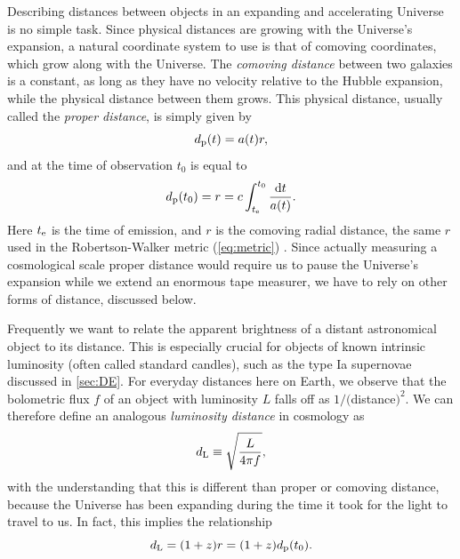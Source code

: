 Describing distances between objects in an expanding and accelerating Universe is no simple task. Since physical distances are growing with the Universe's expansion, a natural coordinate system to use is that of comoving coordinates, which grow along with the Universe. The {\it comoving distance} between two galaxies is a constant, as long as they have no velocity relative to the Hubble expansion, while the physical distance between them grows. This physical distance, usually called the {\it proper distance}, is simply given by
\begin{equation}
d_{\rm p}(t) = a(t) r,
\end{equation}
and at the time of observation $t_0$ is equal to
\begin{equation}
d_{\rm p}(t_0) = r = c \int_{t_{\rm e}}^{t_0} \frac{{\rm d}t}{a(t)}.
\end{equation}
Here $t_{\rm e}$ is the time of emission, and $r$ is the comoving radial distance, the same $r$ used in the Robertson-Walker metric (\autoref{eq:metric}) \citep{Hogg99}. Since actually measuring a cosmological scale proper distance would require us to pause the Universe's expansion while we extend an enormous tape measurer, we have to rely on other forms of distance, discussed below. 

Frequently we want to relate the apparent brightness of a distant astronomical object to its distance. This is especially crucial for objects of known intrinsic luminosity (often called standard candles), such as the type Ia supernovae discussed in \autoref{sec:DE}. For everyday distances here on Earth, we observe that the bolometric flux $f$ of an object with luminosity $L$ falls off as $1/($distance$)^2$. We can therefore define an analogous {\it luminosity distance} in cosmology as
\begin{equation}
\label{eqn:dL}
d_{\rm L} \equiv \sqrt{\frac{L}{4\pi f}},
\end{equation}
with the understanding that this is different than proper or comoving distance, because the Universe has been expanding during the time it took for the light to travel to us. In fact, this implies the relationship
\begin{equation}
d_{\rm L} = (1+z)r = (1+z)d_{\rm p}(t_0).
\end{equation}

